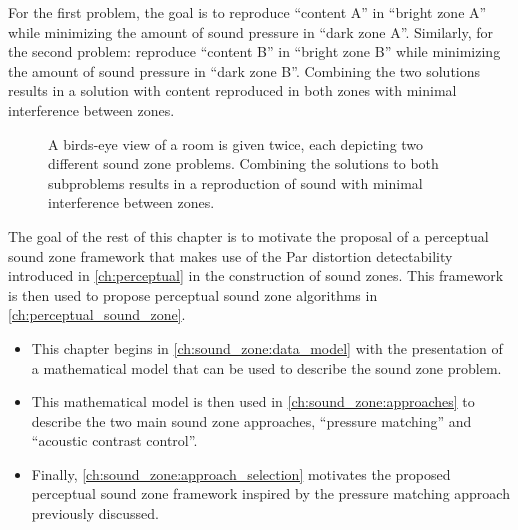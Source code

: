 For the first problem, the goal is to reproduce ``content A'' in ``bright zone A'' while minimizing 
the amount of sound pressure in ``dark zone A''.
Similarly, for the second problem: reproduce ``content B'' in ``bright zone B'' while minimizing the 
amount of sound pressure in ``dark zone B''.
Combining the two solutions results in a solution with content reproduced in both zones with 
minimal interference between zones.

\begin{figure}[]
    \centering
    \begin{subfigure}{0.49\linewidth}
        \centering
        \scalebox{0.9}{}
    \end{subfigure}
    \begin{subfigure}{0.49\linewidth}
        \centering
        \scalebox{0.9}{}
    \end{subfigure}
    \caption{A birds-eye view of a room is given twice, each depicting two different sound zone problems. Combining the solutions to both subproblems results in a reproduction of sound with minimal interference between zones.}
    \label{fig:sound_zones:background:bright_dark_example}
\end{figure}

The goal of the rest of this chapter is to motivate the proposal of a perceptual sound zone framework that makes use of the Par distortion detectability introduced in \autoref{ch:perceptual} in the construction of sound zones.
This framework is then used to propose perceptual sound zone algorithms in \autoref{ch:perceptual_sound_zone}.
\begin{itemize}
    \item This chapter begins in \autoref{ch:sound_zone:data_model} with the presentation of  
        a mathematical model that can be used to describe the sound zone problem.
    \item This mathematical model is then used in \autoref{ch:sound_zone:approaches} 
        to describe the two main sound zone approaches, ``pressure matching'' and ``acoustic contrast control''.
    \item Finally, \autoref{ch:sound_zone:approach_selection} motivates the proposed perceptual sound zone framework
        inspired by the pressure matching approach previously discussed.
\end{itemize}
